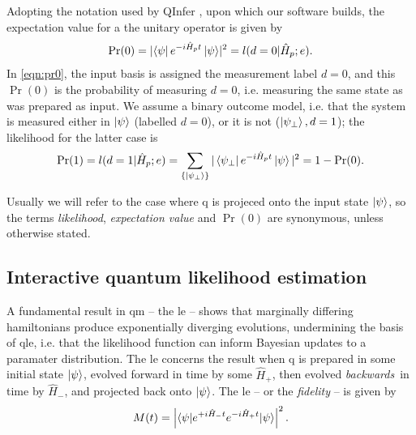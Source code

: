 Adopting the notation used by QInfer \cite{qinfer-1_0}, upon which our software builds, 
    the expectation value for a the unitary operator is given by
\begin{equation}\label{eqn:pr0}
    \Pr(0) =  \lvert \bra{\psi} e^{-i \hat{H}_p t} \ket{\psi}\rvert^2  = l(d=0 | \hat{H}_p; e).
\end{equation}
In \cref{eqn:pr0}, the input basis is assigned the measurement label $d=0$, and this $\Pr(0)$ is the probability 
    of measuring $d=0$, i.e. measuring the same state as was prepared as input. 
We assume a binary outcome model\footnotemark, 
    i.e. that the system is measured either in $\ket{\psi}$ (labelled $d=0$), or it is not ($\ket{\psi_{\perp}}, d=1$);
    the \gls{likelihood} for the latter case is
\begin{equation}\label{eqn:pr1}
    \Pr(1) = l(d=1 | \hat{H}_p; e) = \sum_{\{\ket{\psi_{\perp}}\}} | \bra{\psi_{\perp}} e^{-i \hat{H}_p t} \ket{\psi}  |^2 = 1 - \Pr(0).
\end{equation}

\par 
Usually we will refer to the case where \gls{q} is projeced onto the input state $\ket{\psi}$, 
    so the terms \emph{likelihood}, \emph{expectation value} and \emph{$\Pr(0)$} are synonymous, 
    unless otherwise stated. 


\subsection{Interactive quantum likelihood estimation}\label{sec:iqle}
A fundamental result in \gls{qm} -- the \gls{le} -- shows that marginally differing \glspl{hamiltonian} 
    produce exponentially diverging evolutions,  undermining the basis of \gls{qle}, 
    i.e. that the likelihood function can inform Bayesian updates to a paramater distribution. 
The \gls{le} concerns the result when \gls{q} is prepared in some initial state $\ket{\psi}$, 
    evolved forward in time by some $\hat{H}_+$, then evolved \emph{backwards}\footnotemark \ in time by $\hat{H}_{-}$,
    and projected back onto $\ket{\psi}$. 
The \gls{le} -- or the \emph{fidelity} -- is given by 
\begin{equation}
    \label{eqn:loschmidt_echo}
    M(t) = \left\lvert  \braket{ \psi | e^{+i\hat{H}_{-} t} e^{-i \hat{H}_{+} t} | \psi}  \right\rvert^2.
\end{equation}
\par

